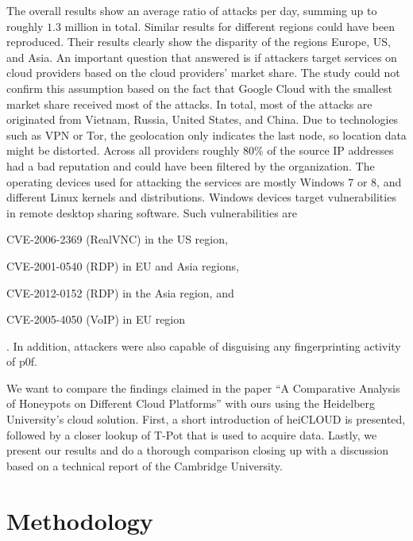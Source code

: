 The overall results show an average ratio of  attacks per day, summing up to roughly $1.3$ million in total.
Similar results for different regions could have been reproduced.
Their results clearly show the disparity of the regions Europe, US, and Asia.
An important question that \citet{Kelly2021} answered is if attackers target services on cloud providers based on the cloud providers' market share.
The study could not confirm this assumption based on the fact that Google Cloud with the smallest market share received most of the attacks.
In total, most of the attacks are originated from Vietnam, Russia, United States, and China.
Due to technologies such as VPN or Tor, the geolocation only indicates the last node, so location data might be distorted.
Across all providers roughly $80\%$ of the source IP addresses had a bad reputation and could have been filtered by the organization.
The operating devices used for attacking the services are mostly Windows 7 or 8, and different Linux kernels and distributions.
Windows devices target vulnerabilities in remote desktop sharing software. Such vulnerabilities are
\begin{enumerate*}[label=(\roman*)]
    \item CVE-2006-2369\cite{CVE-2006-2369} (RealVNC) in the US region,
    \item CVE-2001-0540\cite{CVE-2001-0540} (RDP) in EU and Asia regions,
    \item CVE-2012-0152\cite{CVE-2012-0152} (RDP) in the Asia region, and
    \item CVE-2005-4050\cite{CVE-2005-4050} (VoIP) in EU region
\end{enumerate*}.
In addition, attackers were also capable of disguising any fingerprinting activity of p0f.

We want to compare the findings \citet{Kelly2021} claimed in the paper \enquote{A Comparative Analysis of Honeypots on Different Cloud Platforms} with ours using the Heidelberg University's cloud solution.
First, a short introduction of heiCLOUD is presented, followed by a closer lookup of T-Pot that is used to acquire data.
Lastly, we present our results and do a thorough comparison closing up with a discussion based on a technical report of the Cambridge University.

\section{Methodology}

